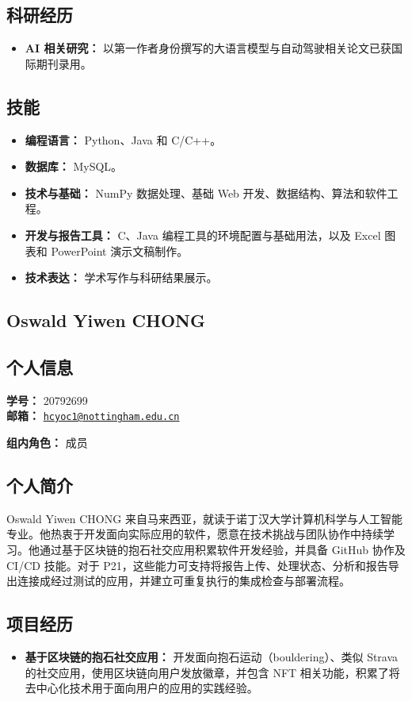 \documentclass[a4paper,12pt]{article}
\newcommand{\PersonalInformation}[2]{%
  \subsection*{个人信息}
  \if\relax\detokenize{#1}\relax\else
  \noindent\textbf{学号：} #1\\
  \fi
  \textbf{邮箱：} #2\par
}
\begin{document}
\subsection*{科研经历}
\begin{itemize}
  \item \textbf{AI 相关研究：} 以第一作者身份撰写的大语言模型与自动驾驶相关论文已获国际期刊录用。
\end{itemize}

\subsection*{技能}
\begin{itemize}
  \item \textbf{编程语言：} Python、Java 和 C/C++。
  \item \textbf{数据库：} MySQL。
  \item \textbf{技术与基础：} NumPy 数据处理、基础 Web 开发、数据结构、算法和软件工程。
  \item \textbf{开发与报告工具：} C、Java 编程工具的环境配置与基础用法，以及 Excel 图表和 PowerPoint 演示文稿制作。
  \item \textbf{技术表达：} 学术写作与科研结果展示。
\end{itemize}

\subsection{Oswald Yiwen CHONG}
\PersonalInformation{20792699}{\href{mailto:hcyoc1@nottingham.edu.cn}{\nolinkurl{hcyoc1@nottingham.edu.cn}}}
\noindent\textbf{组内角色：} 成员\par

\subsection*{个人简介}
Oswald Yiwen CHONG 来自马来西亚，就读于诺丁汉大学计算机科学与人工智能专业。他热衷于开发面向实际应用的软件，愿意在技术挑战与团队协作中持续学习。他通过基于区块链的抱石社交应用积累软件开发经验，并具备 GitHub 协作及 CI/CD 技能。对于 P21，这些能力可支持将报告上传、处理状态、分析和报告导出连接成经过测试的应用，并建立可重复执行的集成检查与部署流程。

\subsection*{项目经历}
\begin{itemize}
  \item \textbf{基于区块链的抱石社交应用：} 开发面向抱石运动（bouldering）、类似 Strava 的社交应用，使用区块链向用户发放徽章，并包含 NFT 相关功能，积累了将去中心化技术用于面向用户的应用的实践经验。
\end{itemize}
\end{document}
